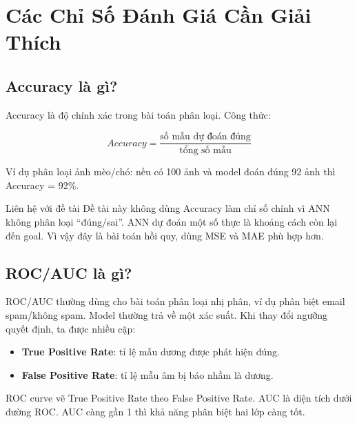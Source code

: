 \documentclass[12pt,a4paper]{article}
\newcommand{\term}[1]{\textbf{#1}}
\begin{document}
\section{Các Chỉ Số Đánh Giá Cần Giải Thích}

\subsection{Accuracy là gì?}

Accuracy là độ chính xác trong bài toán phân loại. Công thức:

\[
    Accuracy = \frac{\text{số mẫu dự đoán đúng}}{\text{tổng số mẫu}}
\]

Ví dụ phân loại ảnh mèo/chó: nếu có 100 ảnh và model đoán đúng 92 ảnh thì Accuracy = 92\%.

\begin{warnbox}{Liên hệ với đề tài}
Đề tài này không dùng Accuracy làm chỉ số chính vì ANN không phân loại ``đúng/sai''. ANN dự đoán một số thực là khoảng cách còn lại đến goal. Vì vậy đây là bài toán hồi quy, dùng MSE và MAE phù hợp hơn.
\end{warnbox}

\subsection{ROC/AUC là gì?}

ROC/AUC thường dùng cho bài toán phân loại nhị phân, ví dụ phân biệt email spam/không spam. Model thường trả về một xác suất. Khi thay đổi ngưỡng quyết định, ta được nhiều cặp:

\begin{itemize}
    \item \term{True Positive Rate}: tỉ lệ mẫu dương được phát hiện đúng.
    \item \term{False Positive Rate}: tỉ lệ mẫu âm bị báo nhầm là dương.
\end{itemize}

ROC curve vẽ True Positive Rate theo False Positive Rate. AUC là diện tích dưới đường ROC. AUC càng gần 1 thì khả năng phân biệt hai lớp càng tốt.

\begin{center}
\end{center}
\end{document}
